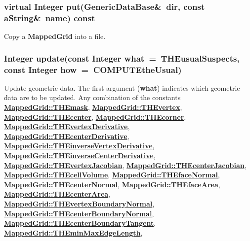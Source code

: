\documentclass{article}
\begin{document}
  \subsubsection{virtual Integer put(GenericDataBase\&~dir, const aString\&~name) const}
  \label{MappedGrid::put(dir,name) const}
    Copy a \textbf{MappedGrid} into a file.
  \subsubsection{Integer update(const Integer what~=~THEusualSuspects, const Integer how~=~COMPUTEtheUsual)}
  \label{MappedGrid::update(what,how)}
    Update geometric data.
    The first argument (\textbf{what}) indicates which geometric data are to be updated.  Any combination of the constants
    {\bf{}\hyperref{THEmask}{THEmask \rm(\S}{)}{MappedGrid::THEmask}},
    {\bf{}\hyperref{THEvertex}{THEvertex \rm(\S}{)}{MappedGrid::THEvertex}},
    {\bf{}\hyperref{THEcenter}{THEcenter \rm(\S}{)}{MappedGrid::THEcenter}},
    {\bf{}\hyperref{THEcorner}{THEcorner \rm(\S}{)}{MappedGrid::THEcorner}},
    {\bf{}\hyperref{THEvertexDerivative}{THEvertexDerivative \rm(\S}{)}{MappedGrid::THEvertexDerivative}},
    {\bf{}\hyperref{THEcenterDerivative}{THEcenterDerivative \rm(\S}{)}{MappedGrid::THEcenterDerivative}},
    {\bf{}\hyperref{THEinverseVertexDerivative}{THEinverseVertexDerivative \rm(\S}{)}{MappedGrid::THEinverseVertexDerivative}},
    {\bf{}\hyperref{THEinverseCenterDerivative}{THEinverseCenterDerivative \rm(\S}{)}{MappedGrid::THEinverseCenterDerivative}},
    {\bf{}\hyperref{THEvertexJacobian}{THEvertexJacobian \rm(\S}{)}{MappedGrid::THEvertexJacobian}},
    {\bf{}\hyperref{THEcenterJacobian}{THEcenterJacobian \rm(\S}{)}{MappedGrid::THEcenterJacobian}},
    {\bf{}\hyperref{THEcellVolume}{THEcellVolume \rm(\S}{)}{MappedGrid::THEcellVolume}},
    {\bf{}\hyperref{THEfaceNormal}{THEfaceNormal \rm(\S}{)}{MappedGrid::THEfaceNormal}},
    {\bf{}\hyperref{THEcenterNormal}{THEcenterNormal \rm(\S}{)}{MappedGrid::THEcenterNormal}},
    {\bf{}\hyperref{THEfaceArea}{THEfaceArea \rm(\S}{)}{MappedGrid::THEfaceArea}},
    {\bf{}\hyperref{THEcenterArea}{THEcenterArea \rm(\S}{)}{MappedGrid::THEcenterArea}},
    {\bf{}\hyperref{THEvertexBoundaryNormal}{THEvertexBoundaryNormal \rm(\S}{)}{MappedGrid::THEvertexBoundaryNormal}},
    {\bf{}\hyperref{THEcenterBoundaryNormal}{THEcenterBoundaryNormal \rm(\S}{)}{MappedGrid::THEcenterBoundaryNormal}},
    {\bf{}\hyperref{THEcenterBoundaryTangent}{THEcenterBoundaryTangent \rm(\S}{)}{MappedGrid::THEcenterBoundaryTangent}},
    {\bf{}\hyperref{THEminMaxEdgeLength}{THEminMaxEdgeLength \rm(\S}{)}{MappedGrid::THEminMaxEdgeLength}},
\end{document}
